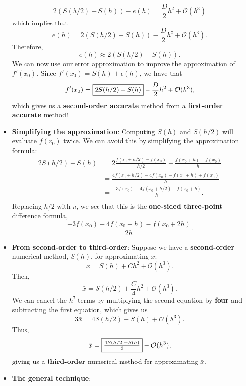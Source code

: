 \documentclass{report}
\begin{document}
\begin{itemize}
            $$
            2(S(h/2) - S(h)) - e(h) = \frac{D}{2}h^2 + \mathcal{O}(h^3)
            $$
            which implies that
            $$
            e(h) = 2(S(h/2) - S(h)) - \frac{D}{2}h^2 + \mathcal{O}(h^3).
            $$
            Therefore,
            $$
            e(h) \approx 2(S(h/2) - S(h)).
            $$
            \bigbreak \noindent 
            We can now use our error approximation to improve the approximation of $f'(x_0)$. 
            \bigbreak \noindent 
            Since $f'(x_0) = S(h) + e(h)$, we have that
            $$
            f'(x_0) = \fbox{$2S(h/2) - S(h)$} - \frac{D}{2}h^2 + \mathcal{O}(h^3),
            $$
            which gives us a \textbf{second-order accurate} method from a \textbf{first-order accurate} method!
        \item \textbf{Simplifying the approximation}:
            Computing $S(h)$ and $S(h/2)$ will evaluate $f(x_0)$ twice. We can avoid this by simplifying the approximation formula:
            \begin{align}
                2S(h/2) - S(h) 
&= 2\frac{f(x_0 + h/2) - f(x_0)}{h/2} - \frac{f(x_0 + h) - f(x_0)}{h} \\
&= \frac{4f(x_0 + h/2) - 4f(x_0) - f(x_0 + h) + f(x_0)}{h} \\
&= \frac{-3f(x_0) + 4f(x_0 + h/2) - f(x_0 + h)}{h}. \\
            \end{align}
            Replacing $h/2$ with $h$, we see that this is the \textbf{one-sided three-point} difference formula,
            $${\displaystyle \frac{- 3f(x_0) + 4f(x_0 + h) - f(x_0 + 2h)}{2h}}.$$
        \item \textbf{From second-order to third-order}:
            Suppose we have a \textbf{second-order} numerical method, $S(h)$, for approximating $\bar{x}$:
            $$
            \bar{x} = S(h) + Ch^2 + \mathcal{O}(h^3).
            $$
            Then,
            $$
            \bar{x} = S(h/2) + \frac{C}{4}h^2 + \mathcal{O}(h^3).
            $$
            We can cancel the $h^2$ terms by multiplying the second equation by \textbf{four} and subtracting the first equation, which gives us
            $$
            3\bar{x} = 4S(h/2) - S(h) + \mathcal{O}(h^3).
            $$
            Thus,
            $$
            \bar{x} = \fbox{$\frac{4S(h/2) - S(h)}{3}$} + \mathcal{O}(h^3),
            $$
            giving us a \textbf{third-order} numerical method for approximating $\bar{x}$.
        \item \textbf{The general technique}:

\end{itemize}
\end{document}
